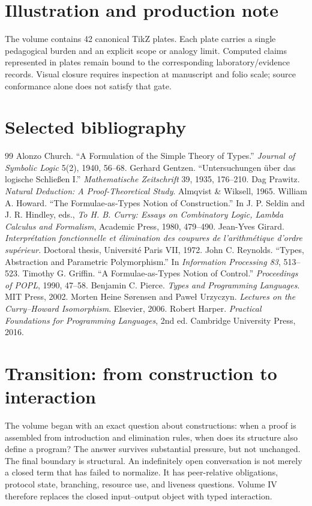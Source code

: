 \documentclass[11pt,openany]{book}
\begin{document}
\chapter*{Illustration and production note}
The volume contains 42 canonical TikZ plates. Each plate carries a single pedagogical burden and an explicit scope or analogy limit. Computed claims represented in plates remain bound to the corresponding laboratory/evidence records. Visual closure requires inspection at manuscript and folio scale; source conformance alone does not satisfy that gate.

\chapter*{Selected bibliography}
\begin{thebibliography}{99}
 Alonzo Church. ``A Formulation of the Simple Theory of Types.'' \emph{Journal of Symbolic Logic} 5(2), 1940, 56--68.
 Gerhard Gentzen. ``Untersuchungen über das logische Schließen I.'' \emph{Mathematische Zeitschrift} 39, 1935, 176--210.
 Dag Prawitz. \emph{Natural Deduction: A Proof-Theoretical Study}. Almqvist \& Wiksell, 1965.
 William A. Howard. ``The Formulae-as-Types Notion of Construction.'' In J. P. Seldin and J. R. Hindley, eds., \emph{To H. B. Curry: Essays on Combinatory Logic, Lambda Calculus and Formalism}, Academic Press, 1980, 479--490.
 Jean-Yves Girard. \emph{Interprétation fonctionnelle et élimination des coupures de l'arithmétique d'ordre supérieur}. Doctoral thesis, Université Paris VII, 1972.
 John C. Reynolds. ``Types, Abstraction and Parametric Polymorphism.'' In \emph{Information Processing 83}, 513--523.
 Timothy G. Griffin. ``A Formulae-as-Types Notion of Control.'' \emph{Proceedings of POPL}, 1990, 47--58.
 Benjamin C. Pierce. \emph{Types and Programming Languages}. MIT Press, 2002.
 Morten Heine Sørensen and Paweł Urzyczyn. \emph{Lectures on the Curry--Howard Isomorphism}. Elsevier, 2006.
 Robert Harper. \emph{Practical Foundations for Programming Languages}, 2nd ed. Cambridge University Press, 2016.
\end{thebibliography}

\chapter*{Transition: from construction to interaction}
The volume began with an exact question about constructions: when a proof is assembled from introduction and elimination rules, when does its structure also define a program? The answer survives substantial pressure, but not unchanged. The final boundary is structural. An indefinitely open conversation is not merely a closed term that has failed to normalize. It has peer-relative obligations, protocol state, branching, resource use, and liveness questions. Volume IV therefore replaces the closed input--output object with typed interaction.

\printindex
\end{document}
